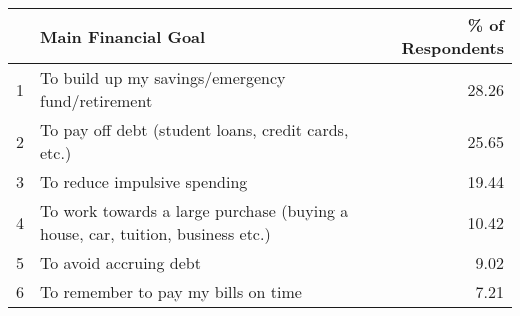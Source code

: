 \begin{table}[ht]
\centering
\begin{tabular}{rlr}
  \hline
 & Main Financial Goal & \% of Respondents \\ 
  \hline
1 & To build up my savings/emergency fund/retirement & 28.26 \\ 
  2 & To pay off debt (student loans, credit cards, etc.) & 25.65 \\ 
  3 & To reduce impulsive spending & 19.44 \\ 
  4 & To work towards a large purchase (buying a house, car, tuition, business etc.) & 10.42 \\ 
  5 & To avoid accruing debt & 9.02 \\ 
  6 & To remember to pay my bills on time & 7.21 \\ 
   \hline
\end{tabular}
\end{table}
